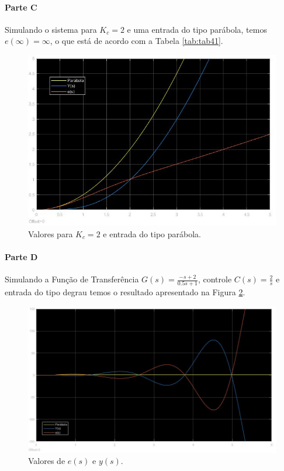 \documentclass[
]{book}
\theoremstyle{definition}
\theoremstyle{definition}
\theoremstyle{definition}
\theoremstyle{remark}
\begin{document}
\hypertarget{parte-c-1}{%
\paragraph*{Parte C}\label{parte-c-1}}

Simulando o sistema para \(K_c = 2\) e uma entrada do tipo parábola, temos \(e(\infty) = \infty\), o que está de acordo com a Tabela \ref{tab:tab41}.

\begin{figure}
\includegraphics[width=0.8\linewidth]{Imagens/Lab4/Resolução/prob2C1} \caption{Valores para $K_c = 2$ e entrada do tipo parábola.}\label{fig:fig42C1}
\end{figure}

\hypertarget{parte-d}{%
\paragraph*{Parte D}\label{parte-d}}

Simulando a Função de Transferência \(G(s) = \frac {-s+2}{0.5s +1}\), controle \(C(s) = \frac {2}{s}\) e entrada do tipo degrau temos o resultado apresentado na Figura \ref{fig:fig42D1}.

\begin{figure}
\includegraphics[width=0.8\linewidth]{Imagens/Lab4/Resolução/prob2D1} \caption{Valores de $e(s)$ e $y(s)$.}\label{fig:fig42D1}
\end{figure}
\end{document}
